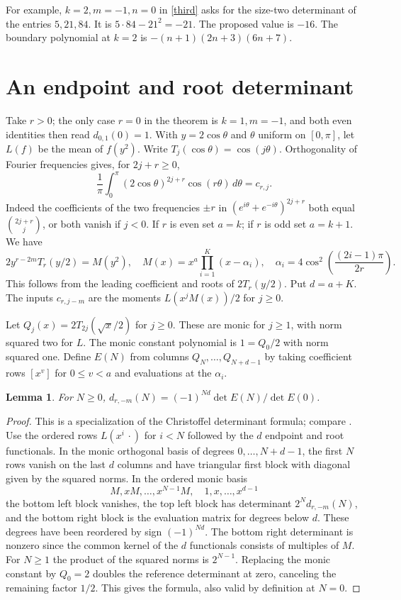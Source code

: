 \documentclass[11pt]{article}
\newtheorem{lemma}[theorem]{Lemma}
\begin{document}
For example, $k=2,m=-1,n=0$ in \eqref{third} asks for the size-two determinant of the entries $5,21,84$. It is $5\cdot84-21^2=-21$. The proposed value is $-16$. The boundary polynomial at $k=2$ is $-(n+1)(2n+3)(6n+7)$.

\section{An endpoint and root determinant}
Take $r>0$; the only case $r=0$ in the theorem is $k=1,m=-1$, and both even identities then read $d_{0,1}(0)=1$. With $y=2\cos\theta$ and $\theta$ uniform on $[0,\pi]$, let $L(f)$ be the mean of $f(y^2)$. Write $T_j(\cos\theta)=\cos(j\theta)$. Orthogonality of Fourier frequencies gives, for $2j+r\ge0$,
\[
 \frac1\pi\int_0^\pi(2\cos\theta)^{2j+r}\cos(r\theta)\,d\theta=c_{r,j}.
\]
Indeed the coefficients of the two frequencies $\pm r$ in $(e^{i\theta}+e^{-i\theta})^{2j+r}$ both equal $\binom{2j+r}{j}$, or both vanish if $j<0$. If $r$ is even set $a=k$; if $r$ is odd set $a=k+1$. We have
\[
 2y^{r-2m}T_r(y/2)=M(y^2),\quad
 M(x)=x^a\prod_{i=1}^K(x-\alpha_i),\quad
 \alpha_i=4\cos^2\!\left(\frac{(2i-1)\pi}{2r}\right).
\]
This follows from the leading coefficient and roots of $2T_r(y/2)$. Put $d=a+K$. The inputs $c_{r,j-m}$ are the moments $L(x^j M(x))/2$ for $j\ge0$.

Let $Q_j(x)=2T_{2j}(\sqrt{x}/2)$ for $j\ge0$. These are monic for $j\ge1$, with norm squared two for $L$. The monic constant polynomial is $1=Q_0/2$ with norm squared one. Define $E(N)$ from columns $Q_N,\ldots,Q_{N+d-1}$ by taking coefficient rows $[x^v]$ for $0\le v<a$ and evaluations at the $\alpha_i$.
\begin{lemma}\label{chris}
For $N\ge0$, \(d_{r,-m}(N)=(-1)^{Nd}\det E(N)/\det E(0)\).
\end{lemma}
\begin{proof}
This is a specialization of the Christoffel determinant formula; compare \cite{kratt}. Use the ordered rows $L(x^i\,\cdot)$ for $i<N$ followed by the $d$ endpoint and root functionals. In the monic orthogonal basis of degrees $0,\ldots,N+d-1$, the first $N$ rows vanish on the last $d$ columns and have triangular first block with diagonal given by the squared norms. In the ordered monic basis
\[
 M,xM,\ldots,x^{N-1}M,\quad1,x,\ldots,x^{d-1}
\]
the bottom left block vanishes, the top left block has determinant $2^N d_{r,-m}(N)$, and the bottom right block is the evaluation matrix for degrees below $d$. These degrees have been reordered by sign $(-1)^{Nd}$. The bottom right determinant is nonzero since the common kernel of the $d$ functionals consists of multiples of $M$. For $N\ge1$ the product of the squared norms is $2^{N-1}$. Replacing the monic constant by $Q_0=2$ doubles the reference determinant at zero, canceling the remaining factor $1/2$. This gives the formula, also valid by definition at $N=0$.
\end{proof}
\end{document}

